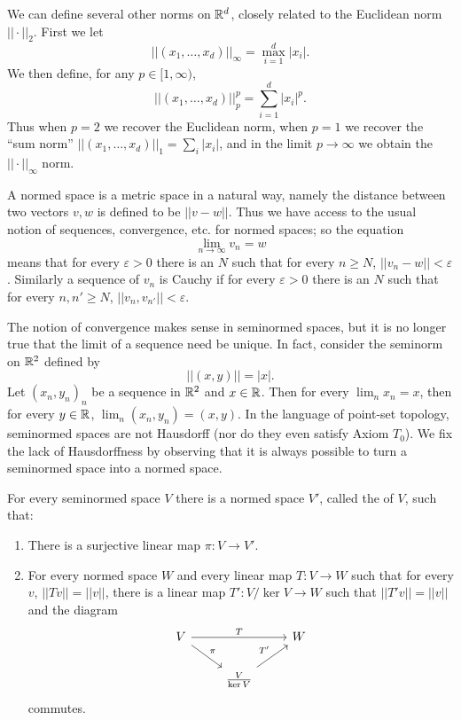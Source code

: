 \begin{example}
We can define several other norms on $\mathbb{R}^d$, closely related to the Euclidean norm $||\cdot||_2$. First we let
\[||(x_1, \dots, x_d)||_{\infty} = \max_{i=1}^{d} |x_i|.\]
We then define, for any $p \in [1, \infty)$, 
\[||(x_1, \dots, x_d)||_{p} ^{p} = \sum_{i=1}^{d} |x_i|^p.\]
Thus when $p = 2$ we recover the Euclidean norm, when $p = 1$ we recover the ``sum norm'' $||(x_1, \dots, x_d)||_1 = \sum_{i} |x_i|$, and in the limit $p \to \infty$ we obtain the $||\cdot||_\infty$ norm.
\end{example}

\begin{subsec}
A normed space is a metric space in a natural way, namely the distance between two vectors $v,w$ is defined to be $||v - w||$.
Thus we have access to the usual notion of sequences, convergence, etc. for normed spaces; so the equation
\[\lim_{n \to \infty} v_{n} = w\]
means that for every $\varepsilon > 0$ there is an $N$ such that for every $n \geq N$, $||v_{n} - w|| < \varepsilon$.
Similarly a sequence of $v_{n}$ is Cauchy if for every $\varepsilon > 0$ there is an $N$ such that for every $n, n' \geq N$, $||v_{n}, v_{n'}|| < \varepsilon$.
\end{subsec}

\begin{subsec}
The notion of convergence makes sense in seminormed spaces, but it is no longer true that the limit of a sequence need be unique.
In fact, consider the seminorm on $\mathbb{R}^2$ defined by
\[||(x, y)|| = |x|.\]
Let $(x_{n}, y_{n})_{n}$ be a sequence in $\mathbb{R}^2$ and $x \in \mathbb{R}$. Then for every $\lim_{n} x_{n} = x$, then for every $y \in \mathbb{R}$, $\lim_{n} (x_{n}, y_{n}) = (x, y)$.
In the language of point-set topology, seminormed spaces are not Hausdorff (nor do they even satisfy Axiom $T_0$).
We fix the lack of Hausdorffness by observing that it is always possible to turn a seminormed space into a normed space.
\end{subsec}

\begin{theorem}\label{existence of normalization}
For every seminormed space $V$ there is a normed space $V'$, called the  of $V$, such that:
\begin{enumerate}
\item There is a surjective linear map $\pi: V \to V'$.
\item For every normed space $W$ and every linear map $T: V \to W$ such that for every $v$, $||Tv|| = ||v||$, there is a linear map $T': V/\ker V \to W$ such that $||T'v|| = ||v||$ and the diagram
\begin{equation}\label{normification universal}
\begin{tikzcd}
V \arrow[rr,"T"] \arrow[dr,"\pi"] && W\\
& \frac{V}{\ker V} \arrow[ur,"T'"]
\end{tikzcd}
\end{equation}
commutes.
\end{enumerate}
\end{theorem}

